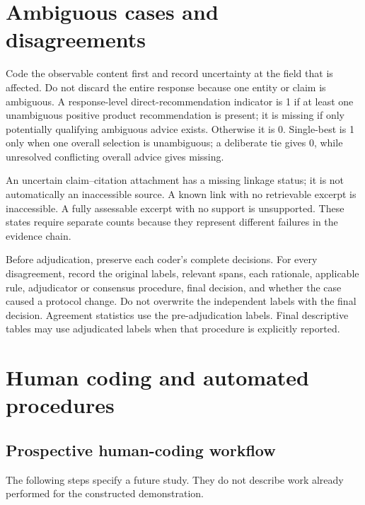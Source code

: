 \documentclass[10pt,a4paper]{article}
\begin{document}
\section{Ambiguous cases and disagreements}\label{sec:disagreements}
Code the observable content first and record uncertainty at the field that is affected. Do not discard the entire response because one entity or claim is ambiguous. A response-level direct-recommendation indicator is 1 if at least one unambiguous positive product recommendation is present; it is missing if only potentially qualifying ambiguous advice exists. Otherwise it is 0. Single-best is 1 only when one overall selection is unambiguous; a deliberate tie gives 0, while unresolved conflicting overall advice gives missing.

An uncertain claim--citation attachment has a missing linkage status; it is not automatically an inaccessible source. A known link with no retrievable excerpt is inaccessible. A fully assessable excerpt with no support is unsupported. These states require separate counts because they represent different failures in the evidence chain.

Before adjudication, preserve each coder's complete decisions. For every disagreement, record the original labels, relevant spans, each rationale, applicable rule, adjudicator or consensus procedure, final decision, and whether the case caused a protocol change. Do not overwrite the independent labels with the final decision. Agreement statistics use the pre-adjudication labels. Final descriptive tables may use adjudicated labels when that procedure is explicitly reported.

\medskip
\section{Human coding and automated procedures}
\subsection{Prospective human-coding workflow}
The following steps specify a future study. They do not describe work already performed for the constructed demonstration.
\end{document}
